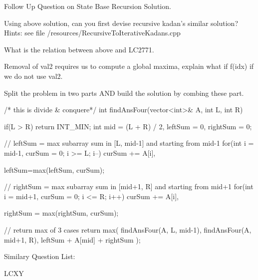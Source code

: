\begin{solution}
    Follow Up Question on State Base Recursion Solution.
    \begin{asparaenum}[(a)]
        \item Using above solution, can you first devise recursive kadan's similar solution? 
        Hints: see file /resources/RecursiveToIterativeKadans.cpp
        \item What is the relation between above and LC2771.
        \item Removal of val2 requires us to compute a global maxima, explain what if f(idx) if we do not use val2.
    \end{asparaenum}  
\end{solution}
    

\begin{solution}
    Split the problem in two parts AND build the solution by combing these part.
    
    \begin{code}
    /* this is divide & conquere*/
    int findAnsFour(vector<int>& A, int L, int R){
        if(L > R) return INT_MIN;
        int mid = (L + R) / 2, leftSum = 0, rightSum = 0;

        // leftSum = max subarray sum in [L, mid-1] and starting from mid-1
        for(int i = mid-1, curSum = 0; i >= L; i--)
            curSum += A[i],
        
        leftSum=max(leftSum, curSum);

        // rightSum = max subarray sum in [mid+1, R] and starting from mid+1
        for(int i = mid+1, curSum = 0; i <= R; i++)
            curSum += A[i],
        
        rightSum = max(rightSum, curSum);        

        // return max of 3 cases 
        return max({ findAnsFour(A, L, mid-1), findAnsFour(A, mid+1, R), leftSum + A[mid] + rightSum });
    }	
    \end{code}
\end{solution}


Similary Question List:
\begin{asparaenum}[(a)]
    \item LCXY
\end{asparaenum}